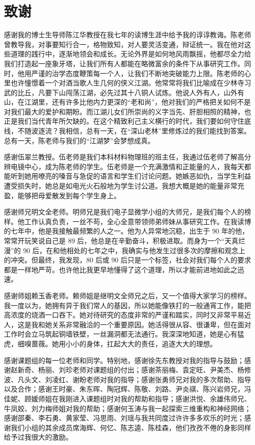 \clearemptydoublepage
{} %
\chapter*{致\quad 谢}

感谢我的博士生导师陈江华教授在我七年的读博生涯中给予我的谆谆教诲。陈老师曾教导我，对事要知行合一，格物致知，对人要灵活变通，辩证统一。我在他对这些道理的践行中，逐渐地领会和成长。无论外界是如何地风雨飘摇，他都尽全力给我们打造起一座象牙塔，让我们所有人都能在略微富余的条件下从事研究工作。同时，他用严谨的治学态度鞭策每一个人，让我们不断地突破能力上限。陈老师的心里也许憧憬着一个对酒当歌人生几何的侠义江湖。他常常将我们比喻成在少林寺习武的比丘，凡要下山闯荡江湖，必先过其十八铜人试炼。他说人外有人，山外有山，在江湖里，还有许多比他内力更深的“老和尚”，他对我们的严格把关如何不是对我们最大的爱护和期盼。而江湖儿女们所崇尚的义字当先、肝胆相照的精神，也正是我们当代青年所欠缺的。在这个精致利己主义横行的时代，我们要如何守住底线，不随波逐流？我相信，总有一天，在“深山老林”里修炼过的我们能找到答案。总有一天，陈老师与我们的“江湖梦”会梦想成真。

感谢伍翠兰教授。伍老师是我们本科材料物理班的班主任，我通过伍老师了解高分辨电镜中心，成为陈老师的学生。伍老师是一个充满激情和正能量的人，我每天都能听到她用嘹亮的嗓音与急促的语言和学生们讨论问题。她嫉恶如仇，当学生利益遭受损失时，她总是如电光火石般地为学生讨公道。我想大概是她的能量非常充盈，能够把母爱散发到每个学生身上。

感谢师兄明文全老师。明师兄是我们电子显微学小组的大师兄，是我们每个人的榜样。他工作认真负责，一丝不苟，全心全意带领师弟师妹从事研究工作。在我读博的七年中，他是我接触最频繁的人之一。他为人异常地沉稳，出生于 90 年的他，常常开玩笑说自己是 89 后，他总是在辛勤奋斗，积极进取。而身为一个“天真烂漫”的 90 后，在和他相处的七年之中，我确实与他发生过很多次的摩擦和观念上的冲突。但最终，我发现，80 后或 90 后只是一个标签，社会对我们每个人的要求都是一样地严苛。也许他比我更早地懂得了这个道理，所以才能前进地如此之迅速。

感谢师姐赖玉香老师。赖师姐是继明文全师兄之后，又一个值得大家学习的榜样。我一度以为，她拥有异于我们常人的基因，所以她能像铁打的一般通宵工作，能把高浓度的烧酒一口吞下。她对待研究的态度非常的严谨和踏实，同时又非常平易近人，这是我和她关系非常融洽的一个重要原因。她活得很从容、很谦卑，但在面对工作时会立马筑起铜墙铁壁，一丝漏洞都无法通行。我深深地知道，她是心有猛虎，细嗅蔷薇。她用小小的身体，扛起大大的责任，追逐大大的理想。

感谢课题组的每一位老师和同学。特别地，感谢徐先东教授对我的指导与鼓励；感谢赵新奇、杨丽、刘珍老师对课题组的付出；感谢茶丽梅、袁定旺、尹美杰、杨修波、凡头文、刘凌红、谢盼老师对我的指导；感谢张勇师兄对我的多次帮助、指导以及合作；感谢王时豪、朱东晖、陶冠辉、陈敬、刘路、尹炎祺、陈兴岩师兄，冯佳妮、顾媛师姐在我刚进入课题组时对我的帮助和指导；感谢洪悦、余雄伟师兄、牛凤姣、刘力梅师姐对我的帮助；感谢何玉涛与我一起探索三维重构和神经网络；感谢邵秦、李石勇、黄家莹、冯思雨、刘瑶与我共同度过许许多多欢乐的时光；感谢我们小组的其余成员席海辉、何忆、陈志逵、陈桂森，他们孜孜不倦的身影同样给予过我很大的激励。

